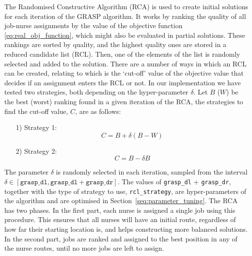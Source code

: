 \documentclass[a4paper,11pt]{elsarticle}
\begin{document}
The Randomised Constructive Algorithm (RCA) is used to create initial solutions for each iteration of the GRASP algorithm. It works by ranking the quality of all job-nurse assignments by the value of the objective function \eqref{eq:real_obj_function}, which might also be evaluated in partial solutions. These rankings are sorted by quality, and the highest quality ones are stored in a reduced candidate list (RCL). Then, one of the elements of the list is randomly selected and added to the solution. There are a number of ways in which an RCL can be created, relating to which is the `cut-off' value of the objective value that decides if an assignment enters the RCL or not. In our implementation we have tested two strategies, both depending on the hyper-parameter $\delta$. Let $B$ ($W$) be the best (worst) ranking found in a given iteration of the RCA, the strategies to find the cut-off value, $C$, are as follows:
\begin{itemize}
     \item[1)] Strategy 1:
     \begin{equation}
         C = B + \delta (B - W)
     \end{equation}

     \item[2)] Strategy 2:
     \begin{equation}
         C = B - \delta B
     \end{equation}
 \end{itemize} 
The parameter $\delta$ is randomly selected in each iteration, sampled from the interval $\delta \in [\texttt{grasp\_dl}, \texttt{grasp\_dl} + \texttt{grasp\_dr}]$.
The values of \texttt{grasp\_dl} + \texttt{grasp\_dr}, together with the type of strategy to use, \texttt{rcl\_strategy}, are hyper-parameters of the algorithm and are optimised in Section~\ref{seq:parameter_tuning}. The RCA has two phases. In the first part, each nurse is assigned a single job using this procedure. This ensures that all nurses will have an initial route, regardless of how far their starting location is, and helps constructing more balanced solutions. In the second part, jobs are ranked and assigned to the best position in any of the nurse routes, until no more jobs are left to assign. 
\end{document}
